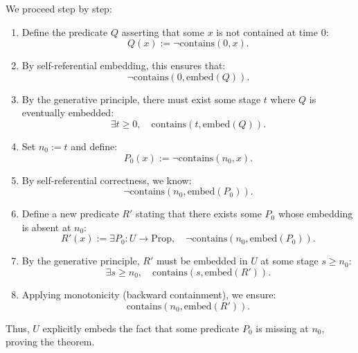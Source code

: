 \documentclass[12pt]{article}
\begin{document}
We proceed step by step:

\begin{enumerate}
    \item Define the predicate \( Q \) asserting that some \( x \) is not contained at time \( 0 \):
    \[
    Q(x) := \neg \text{contains}(0, x).
    \]
    \item By self-referential embedding, this ensures that:
    \[
    \neg \text{contains}(0, \text{embed}(Q)).
    \]
    \item By the generative principle, there must exist some stage \( t \) where \( Q \) is eventually embedded:
    \[
    \exists t \geq 0, \quad \text{contains}(t, \text{embed}(Q)).
    \]
    \item Set \( n_0 := t \) and define:
    \[
    P_0(x) := \neg \text{contains}(n_0, x).
    \]
    \item By self-referential correctness, we know:
    \[
    \neg \text{contains}(n_0, \text{embed}(P_0)).
    \]
    \item Define a new predicate \( R' \) stating that there exists some \( P_0 \) whose embedding is absent at \( n_0 \):
    \[
    R'(x) := \exists P_0: U \to \text{Prop}, \quad \neg \text{contains}(n_0, \text{embed}(P_0)).
    \]
    \item By the generative principle, \( R' \) must be embedded in \( U \) at some stage \( s \geq n_0 \):
    \[
    \exists s \geq n_0, \quad \text{contains}(s, \text{embed}(R')).
    \]
    \item Applying monotonicity (backward containment), we ensure:
    \[
    \text{contains}(n_0, \text{embed}(R')).
    \]
\end{enumerate}

Thus, \( U \) explicitly embeds the fact that some predicate \( P_0 \) is missing at \( n_0 \), proving the theorem.
\end{document}
